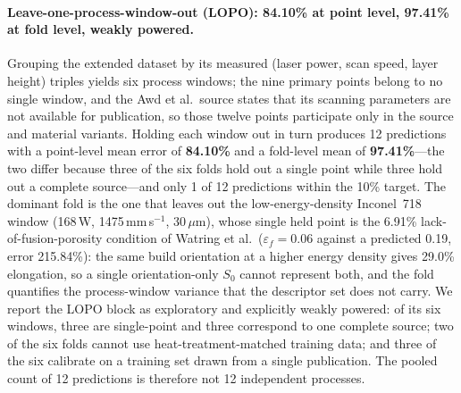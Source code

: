 \documentclass[12pt,a4paper,twocolumn]{article}
\begin{document}
\paragraph{Leave-one-process-window-out (LOPO): 84.10\% at point level, 97.41\% at fold level, weakly powered.}
Grouping the extended dataset by its measured (laser power, scan speed, layer height) triples yields six
process windows; the nine primary points belong to no single window, and the Awd et al.\ source states
that its scanning parameters are not available for publication, so those twelve points participate only
in the source and material variants. Holding each window out in turn produces 12 predictions with a
point-level mean error of \textbf{84.10\%} and a fold-level mean of \textbf{97.41\%}---the two differ
because three of the six folds hold out a single point while three hold out a complete source---and only
1 of 12 predictions within the 10\% target. The dominant fold is the one that leaves out the
low-energy-density Inconel~718 window (168\,W, 1475\,mm\,s$^{-1}$, 30\,$\mu$m), whose single held point is
the 6.91\% lack-of-fusion-porosity condition of Watring et al.\ ($\varepsilon_f = 0.06$ against a
predicted 0.19, error 215.84\%): the same build orientation at a higher energy density gives 29.0\%
elongation, so a single orientation-only $S_0$ cannot represent both, and the fold quantifies the
process-window variance that the descriptor set does not carry. We report the LOPO block as exploratory
and explicitly weakly powered: of its six windows, three are single-point and three correspond to one
complete source; two of the six folds cannot use heat-treatment-matched training data; and three of the
six calibrate on a training set drawn from a single publication. The pooled count of 12 predictions is
therefore not 12 independent processes.
\end{document}
